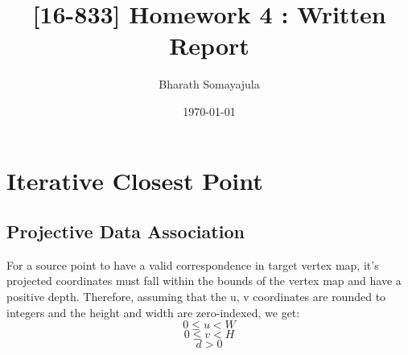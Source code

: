 \documentclass[12pt, a4paper]{article}
\title{[16-833] Homework 4 : Written Report}
\author{Bharath Somayajula}
\date{\today}
\begin{document}
\maketitle

\tableofcontents

\section{Iterative Closest Point}
\subsection{Projective Data Association}
For a source point to have a valid correspondence in target vertex map, it's projected coordinates must fall within the bounds of the vertex map and have a positive depth. Therefore, assuming that the u, v coordinates are rounded to integers and the height and width are zero-indexed, we get:
\[0 \leq  u < W\]
\[0 \leq  v < H\]
\[d > 0\]
\end{document}
